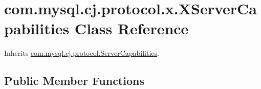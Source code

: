 \hypertarget{classcom_1_1mysql_1_1cj_1_1protocol_1_1x_1_1_x_server_capabilities}{}\section{com.\+mysql.\+cj.\+protocol.\+x.\+X\+Server\+Capabilities Class Reference}
\label{classcom_1_1mysql_1_1cj_1_1protocol_1_1x_1_1_x_server_capabilities}


Inherits \mbox{\hyperlink{interfacecom_1_1mysql_1_1cj_1_1protocol_1_1_server_capabilities}{com.\+mysql.\+cj.\+protocol.\+Server\+Capabilities}}.

\subsection*{Public Member Functions}
